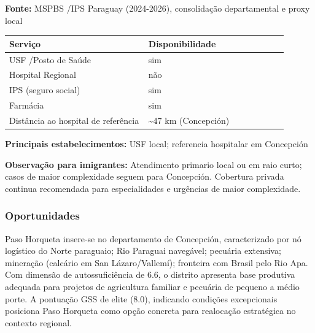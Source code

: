 \textbf{Fonte:} MSPBS /\allowbreak \allowbreak  IPS Paraguay (2024-2026), consolidação
departamental e proxy local

{\def\LTcaptype{none} %
\begin{longtable}{@{}>{\raggedright\arraybackslash}p{0.45\linewidth} >{\raggedright\arraybackslash}p{0.45\linewidth}@{}}
\toprule\noalign{}
Serviço & Disponibilidade \\
\midrule\noalign{}
\endhead
\bottomrule\noalign{}
\endlastfoot
USF /\allowbreak \allowbreak  Posto de Saúde & sim \\
Hospital Regional & não \\
IPS (seguro social) & sim \\
Farmácia & sim \\
Distância ao hospital de referência & \textasciitilde47 km
(Concepción) \\
\end{longtable}
}

\textbf{Principais estabelecimentos:} USF local; referencia hospitalar
em Concepción

\textbf{Observação para imigrantes:} Atendimento primario local ou em
raio curto; casos de maior complexidade seguem para Concepción.
Cobertura privada continua recomendada para especialidades e urgências
de maior complexidade.
\newpage

\subsubsection*{Oportunidades}\label{oport-paso-horqueta-0113}
Paso Horqueta insere-se no departamento de Concepción, caracterizado por nó logístico do Norte paraguaio; Rio Paraguai navegável; pecuária extensiva; mineração (calcário em San Lázaro/Vallemí); fronteira com Brasil pelo Rio Apa. Com dimensão de autossuficiência de 6.6, o distrito apresenta base produtiva adequada para projetos de agricultura familiar e pecuária de pequeno a médio porte. A pontuação GSS de elite (8.0), indicando condições excepcionais posiciona Paso Horqueta como opção concreta para realocação estratégica no contexto regional.

